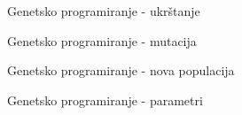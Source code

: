     \begin{frame}{Genetsko programiranje - ukrštanje}
        
    \end{frame}
    
    \begin{frame}{Genetsko programiranje - mutacija}
        
    \end{frame}
    
    \begin{frame}{Genetsko programiranje - nova populacija}
        
    \end{frame}
    
    \begin{frame}{Genetsko programiranje - parametri}
        
    \end{frame}